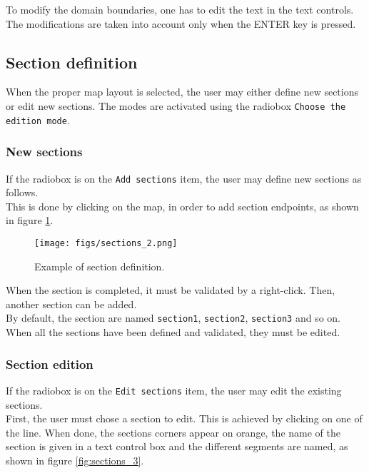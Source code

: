 To modify the domain boundaries, one has to edit the text in the text
controls. The modifications are taken into account only when the ENTER
key is pressed.

\subsection{Section definition}

When the proper map layout is selected, the user may either define new
sections or edit new sections. The modes are activated using the radiobox \verb+Choose the edition mode+. 

\subsubsection{New sections}

If the radiobox is on the \verb+Add sections+ item, the user may define
new sections as follows.\\

This is done by clicking on the map, in order to add section
endpoints, as shown in figure \ref{fig:sections_2}.\\

\begin{figure}[h!]
\centering
\texttt{[image: figs/sections\_2.png]}
\caption{Example of section definition.}
\label{fig:sections_2}
\end{figure}

When the section is
completed, it must be validated by a right-click. Then, another
section can be added.\\ By default, the section are named
\verb+section1+, \verb+section2+, \verb+section3+ and so on.\\

When all the sections have been defined and validated, they must be edited.

\subsubsection{Section edition}

If the radiobox is on the \verb+Edit sections+ item, the user may edit
the existing sections.\\

First, the user must chose a section to edit. This is achieved by
clicking on one of the line. When done, the sections corners appear on
orange, the name of the section is given in a text control box and the
different segments are named, as
shown in figure \ref{fig:sections_3}.\\ 

